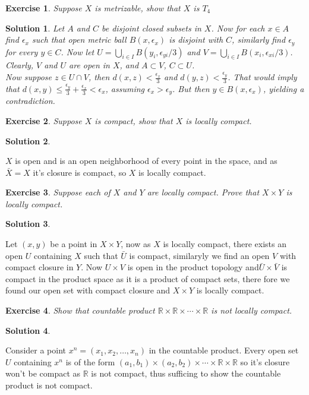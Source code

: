 \documentclass[11pt,a4paper]{article}
\newtheorem{Ex}{Exercise}
\newtheorem{Sol}{Solution}
\newcommand{\R}{\mathbb{R}}
\begin{document}
\begin{Ex}
	Suppose $X$ is metrizable, show that $X$ is $T_4$
\end{Ex}

\begin{Sol}
\noindent Let $A$ and $C$ be disjoint closed subsets in $X$. Now for each $x \in A$ find $\epsilon_x$ such that open metric ball $B(x,\epsilon_x)$ is disjoint with $C$, similarly find $\epsilon_y$ for every $y \in C$. Now let $U = \bigcup_{i \in I}B(y_i, \epsilon_{yi}/3)$ and $V = \bigcup_{i \in I}B(x_i, \epsilon_{xi}/3)$. Clearly, $V$ and $U$ are open in $X$, and $A \subset V$, $C \subset U$. \\
Now suppose $z \in U \cap V$, then $d(x,z)< \frac{\epsilon_x}{3}$ and $d(y,z) < \frac{\epsilon_y}{3}$. That would imply that $d(x,y) \le \frac{\epsilon_y}{3} + \frac{\epsilon_x}{3} < \epsilon_x$, assuming $\epsilon_x > \epsilon_y$. But then $y \in B(x,\epsilon_x)$, yielding a contradiction.
\end{Sol}

\begin{Ex}
	Suppose $X$ is compact, show that $X$ is locally compact.
\end{Ex}

\begin{Sol}\end{Sol}
\noindent $X$ is open and is an open neighborhood of every point in the space, and as $\bar{X}= X$ it's closure is compact, so $X$ is locally compact.
\begin{Ex}
	Suppose each of $X$ and $Y$ are locally compact. Prove that $X \times Y$ is locally compact.
\end{Ex}

\begin{Sol}\end{Sol}
\noindent Let $(x,y)$ be a point in $X \times Y$, now as $X$ is locally compact, there exists an open $U$ containing $X$ such that $\bar{U}$ is compact, similaryly we find an open $V$ with compact closure in $Y$. Now $U \times V$ is open in the product topology and$\bar{U} \times \bar{V}$ is compact in the product space as it is a product of compact sets, there fore we found our open set with compact closure and $X \times Y$ is locally compact. 

\begin{Ex}
	Show that countable product $\R \times \R \times \cdots \times \R$ is not locally compact.
\end{Ex}

\begin{Sol}\end{Sol}
\noindent Consider a point $x^n = (x_1,x_2,\dots, x_n)$ in the countable product. Every open set $U$ containing $x^n$ is of the form $(a_1,b_1)\times(a_2,b_2)\times \cdots \times \R \times \R$ so it's closure won't be compact as $\R$ is not compact, thus sufficing to show the countable product is not compact.
\end{document}
